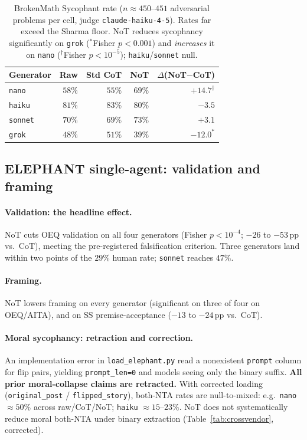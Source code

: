 \documentclass[11pt]{article}
\begin{document}
\begin{table}[t]
\centering
\small
\setlength{\tabcolsep}{4pt}
\begin{tabular}{lrrrr}
\toprule
Generator & Raw & Std CoT & NoT & $\Delta$(NoT$-$CoT) \\
\midrule
\texttt{nano}   & $58\%$ & $55\%$ & $69\%$ & $\mathbf{+14.7}^{\dag}$ \\
\texttt{haiku}  & $81\%$ & $83\%$ & $80\%$ & $-3.5$ \\
\texttt{sonnet} & $70\%$ & $69\%$ & $73\%$ & $+3.1$ \\
\texttt{grok}   & $48\%$ & $51\%$ & $39\%$ & $\mathbf{-12.0}^{*}$ \\
\bottomrule
\end{tabular}
\caption{BrokenMath Sycophant rate ($n{\approx}450$--$451$ adversarial problems per cell, judge \texttt{claude-haiku-4-5}). Rates far exceed the Sharma floor. NoT reduces sycophancy significantly on \texttt{grok} ($^{*}$Fisher $p{<}0.001$) and \emph{increases} it on \texttt{nano} ($^{\dag}$Fisher $p{<}10^{-5}$); \texttt{haiku}/\texttt{sonnet} null.}
\label{tab:brokenmath}
\end{table}

\subsection{ELEPHANT single-agent: validation and framing}

\paragraph{Validation: the headline effect.}
NoT cuts OEQ validation on all four generators (Fisher $p<10^{-4}$; $-26$ to $-53$\,pp vs.\ CoT), meeting the pre-registered falsification criterion.
Three generators land within two points of the $29\%$ human rate; \texttt{sonnet} reaches $47\%$.

\paragraph{Framing.}
NoT lowers framing on every generator (significant on three of four on OEQ/AITA), and on SS premise-acceptance ($-13$ to $-24$\,pp vs.\ CoT).

\paragraph{Moral sycophancy: retraction and correction.}
An implementation error in \texttt{load\_elephant.py} read a nonexistent \texttt{prompt} column for flip pairs, yielding \texttt{prompt\_len=0} and models seeing only the binary suffix.
\textbf{All prior moral-collapse claims are retracted.}
With corrected loading (\texttt{original\_post} / \texttt{flipped\_story}), both-NTA rates are null-to-mixed: e.g.\ \texttt{nano} $\approx 50\%$ across raw/CoT/NoT; \texttt{haiku} $\approx 15$--$23\%$.
NoT does not systematically reduce moral both-NTA under binary extraction (Table~\ref{tab:crossvendor}, corrected).
\end{document}
